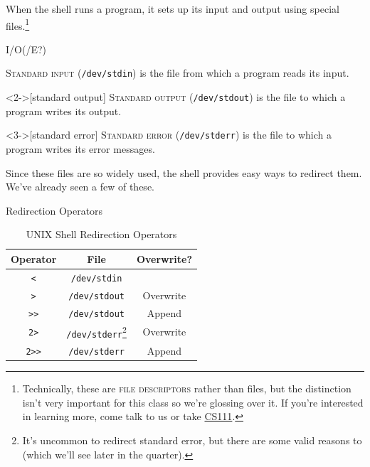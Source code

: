 When the shell runs a program, it sets up its input and output using special
files.\footnote{
  Technically, these are \textsc{file descriptors} rather than files, but the
  distinction isn't very important for this class so we're glossing over it. If
  you're interested in learning more, come talk to us or take
  \href{https://cs111.stanford.edu}{CS111}.
}

\begin{frame}[c]{I/O(/E?)}
  \begin{definition}
    \textsc{Standard input} (\texttt{/dev/stdin}) is the file from which a
    program reads its input.  
  \end{definition}
  \begin{definition}<2->[standard output]
    \textsc{Standard output} (\texttt{/dev/stdout}) is the file to which a
    program writes its output.
  \end{definition}
  \begin{definition}<3->[standard error]
    \textsc{Standard error} (\texttt{/dev/stderr}) is the file to which a
    program writes its error messages.
  \end{definition}
\end{frame}

Since these files are so widely used, the shell provides easy ways to redirect
them.  We've already seen a few of these.

\begin{frame}[c]{Redirection Operators}
  \begin{table}
    \centering
    \begin{tabular}{c|c|c}
      Operator & File & Overwrite? \\
      \hline
      \texttt{<} & \texttt{/dev/stdin} &  \\
      \texttt{>} & \texttt{/dev/stdout} & Overwrite \\
      \texttt{>>} & \texttt{/dev/stdout} & Append \\
      \texttt{2>} & \texttt{/dev/stderr}\footnote{It's uncommon to redirect standard error, but there are some valid reasons to (which we'll see later in the quarter).} & Overwrite \\
      \texttt{2>>} & \texttt{/dev/stderr} & Append \\
    \end{tabular}
    \caption{UNIX Shell Redirection Operators}
    \label{tab:redirection}
  \end{table}
\end{frame}

